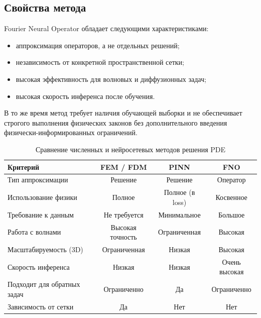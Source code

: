 \documentclass[12pt]{article}
\begin{document}
\subsection*{Свойства метода}

Fourier Neural Operator обладает следующими характеристиками:
\begin{itemize}
\item аппроксимация операторов, а не отдельных решений;
\item независимость от конкретной пространственной сетки;
\item высокая эффективность для волновых и диффузионных задач;
\item высокая скорость инференса после обучения.
\end{itemize}

В то же время метод требует наличия обучающей выборки и не обеспечивает строгого выполнения физических законов без дополнительного введения физически-информированных ограничений.

\begin{table}[h]
\centering
\caption{Сравнение численных и нейросетевых методов решения PDE}
\begin{tabular}{|l|c|c|c|}
\hline
\textbf{Критерий} & \textbf{FEM / FDM} & \textbf{PINN} & \textbf{FNO} \\
\hline
Тип аппроксимации & Решение & Решение & Оператор \\
\hline
Использование физики & Полное & Полное (в loss) & Косвенное \\
\hline
Требование к данным & Не требуется & Минимальное & Большое \\
\hline
Работа с волнами & Высокая точность & Ограниченная & Высокая \\
\hline
Масштабируемость (3D) & Ограниченная & Низкая & Высокая \\
\hline
Скорость инференса & Низкая & Низкая & Очень высокая \\
\hline
Подходит для обратных задач & Ограниченно & Да & Ограниченно \\
\hline
Зависимость от сетки & Да & Нет & Нет \\
\hline
\end{tabular}
\end{table}
\end{document}
